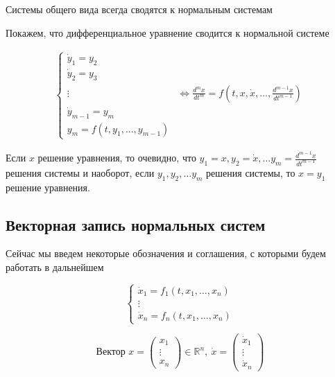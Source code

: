 \documentclass[a4paper]{article}
\theoremstyle{indented}
\theoremstyle{definition}
\theoremstyle{remark}
\begin{document}
Системы общего вида всегда сводятся к нормальным системам

Покажем, что дифференциальное уравнение сводится к нормальной системе

\begin{equation*}
  \begin{aligned}
    \begin{cases}
      \dot y_1 = y_2 &\\  
      \dot y_2 = y_3 & \\ 
      \vdots & \Longleftrightarrow  \frac{d^mx}{dt^m} = f(t,x, \dot x, \ldots, \frac{d^{m-1}x}{dt^{m-1}}) \\        
      \dot y_{m-1} = y_m & \\ 
      y_m = f(t,y_1,\ldots, y_{m-1}) & 
    \end{cases}
  \end{aligned}
\end{equation*}

Если $x$ решение уравнения, то очевидно, что $y_1 = x, y_2 = \dot x, \ldots y_m =  \frac{d^{m-1}x}{dt^{m-1}}$ решения системы и наоборот, если $y_1, y_2, \ldots y_m$ решения системы, то $x = y_1$ решение уравнения.

\subsection{Векторная запись нормальных систем}

Сейчас мы введем некоторые обозначения и соглашения, с которыми будем работать в дальнейшем

\begin{equation*}
  \begin{cases}
    \dot x_1 = f_1(t,x_1, \ldots, x_n)\\
    \vdots \\
    \dot x_n = f_n(t,x_1, \ldots, x_n)
  \end{cases}
\end{equation*}

\begin{equation*}
  \text{Вектор } x = 
  \begin{pmatrix}
    x_1 \\
    \vdots \\
    x_n 
  \end{pmatrix}
  \in \mathbb{R}^n, \
  \dot x = 
  \begin{pmatrix}
    \dot x_1 \\
    \vdots \\
    \dot x_n
  \end{pmatrix}
\end{equation*}
\end{document}
